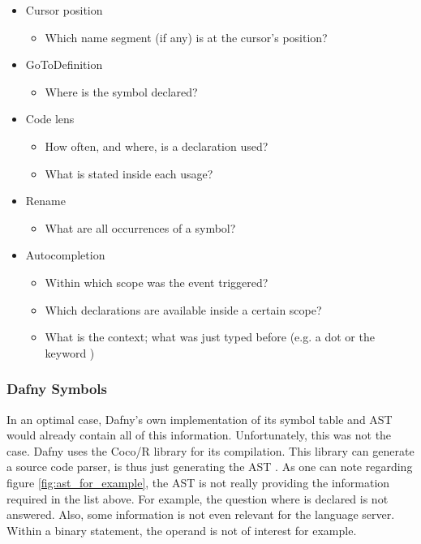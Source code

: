 

\begin{itemize}
    \item Cursor position
    \begin{itemize}
        \item Which name segment (if any) is at the cursor's position?
    \end{itemize}

    \item GoToDefinition
        \begin{itemize}
            \item Where is the symbol declared?
        \end{itemize}

    \item Code lens
        \begin{itemize}
            \item How often, and where, is a declaration used?
            \item What is stated inside each usage?
        \end{itemize}

    \item Rename
        \begin{itemize}
            \item What are all occurrences of a symbol?
        \end{itemize}

    \item Autocompletion
        \begin{itemize}
            \item Within which scope was the event triggered?
            \item Which declarations are available inside a certain scope?
            \item What is the context; what was just typed before (e.g. a dot or the keyword )
        \end{itemize}
\end{itemize}

\subsubsection{Dafny Symbols}
In an optimal case, Dafny's own implementation of its symbol table and AST would already contain all of this information.
Unfortunately, this was not the case.
Dafny uses the Coco/R library for its compilation.
This library can generate a source code parser, is thus just generating the AST \cite{coco}.
As one can note regarding figure \ref{fig:ast_for_example}, the AST is not really providing the information required in the list above.
For example, the question where  is declared is not answered.
Also, some information is not even relevant for the language server.
Within a binary statement, the operand is not of interest for example.\\

